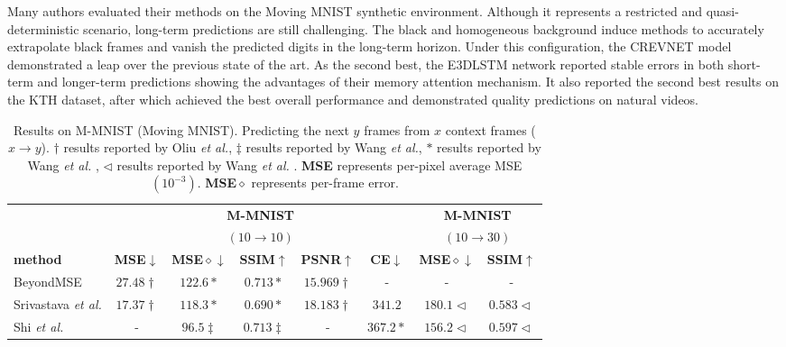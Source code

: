 Many authors evaluated their methods on the Moving MNIST synthetic environment. Although it represents a restricted and quasi-deterministic scenario, long-term predictions are still challenging. The black and homogeneous background induce methods to accurately extrapolate black frames and vanish the predicted digits in the long-term horizon. Under this configuration, the \ac{CREVNET} model demonstrated a leap over the previous state of the art. As the second best, the \ac{E3DLSTM} network reported stable errors in both short-term and longer-term predictions showing the advantages of their memory attention mechanism. It also reported the second best results on the KTH dataset, after \cite{Jin2020} which achieved the best overall performance and demonstrated quality predictions on natural videos.
\begin{table}[!t] 
	\centering
	\footnotesize
	\caption{Results on M-MNIST (Moving MNIST). Predicting the next $y$ frames from $x$ context frames ($x\rightarrow y$). $\dag$ results reported by Oliu \textit{et al.}\cite{Oliu2018}, $\ddag$ results reported by Wang \textit{et al.}\cite{Wang2019b}, $\ast$ results reported by Wang \textit{et al.} \cite{Wang2017}, $\triangleleft$ results reported by Wang \textit{et al.} \cite{Wang2018}. \textbf{\ac{MSE}} represents per-pixel average \ac{MSE} $(10^{-3})$. \textbf{\ac{MSE}}$\mathbf{\diamond}$ represents per-frame error. }
	\label{table:results_moving_mnist}
	\begin{tabular} {@{}lccccccc@{}} 
		\toprule
		& \multicolumn{5}{c}{\textbf{M-MNIST}} & \multicolumn{2}{c}{\textbf{M-MNIST}} \\ 
		& \multicolumn{5}{c}{$(10\rightarrow10)$} & \multicolumn{2}{c}{$(10\rightarrow30)$} \\
		\cmidrule{2-6} \cmidrule(l){7-8} 
		\textbf{method} & \textbf{\ac{MSE}}$\downarrow$ & \textbf{\ac{MSE}$\diamond$$\downarrow$} & \textbf{\ac{SSIM}}$\uparrow$ & \textbf{\ac{PSNR}}$\uparrow$ & \textbf{\ac{CE}}$\downarrow$ & \textbf{\ac{MSE}$\diamond$}$\downarrow$ & \textbf{\ac{SSIM}}$\uparrow$ \\
		\midrule
		BeyondMSE \cite{Mathieu2016} & $27.48\dag$ & $122.6\ast$ & $0.713\ast$ & $15.969\dag$ & - & - & - \\
		Srivastava \textit{et al.} \cite{Srivastava2015} & $17.37\dag$ & $118.3\ast$ & $0.690\ast$ & $18.183\dag$ & $341.2$ & $180.1\triangleleft$ & $0.583\triangleleft$\\ %
		Shi \textit{et al.} \cite{Shi2015} & - & $96.5\ddag$ & $0.713\ddag$ & - & $367.2\ast$ & $156.2\triangleleft$ & $0.597\triangleleft$\\

\end{tabular}
\end{table}
